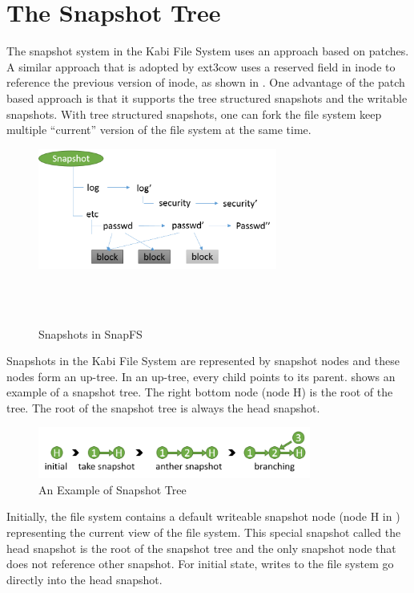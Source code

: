\section{The Snapshot Tree}

    The snapshot system in the Kabi File System uses an approach based on patches. A similar approach that is adopted by ext3cow uses a reserved field in inode to reference the previous version of inode, as shown in . One advantage of the patch based approach is that it supports the tree structured snapshots and the writable snapshots. With tree structured snapshots, one can fork the file system keep multiple ``current'' version of the file system at the same time.

\begin{figure}[t]
\centering
\includegraphics[width=0.7\textwidth]{Chapter-4/figs/fig24.png}
\caption{Snapshots in SnapFS}
~\\
~\\
\label{fig:snapfs_approach}
\end{figure}

    Snapshots in the Kabi File System are represented by snapshot nodes and these nodes form an up-tree. In an up-tree, every child points to its parent.  shows an example of a snapshot tree. The right bottom node (node H) is the root of the tree. The root of the snapshot tree is always the head snapshot.

\begin{figure}[t]
\centering
\includegraphics[width=0.8\textwidth]{Chapter-4/figs/fig13.png}
\caption{An Example of Snapshot Tree}
\label{fig:snap_tree_example}
\end{figure}

    Initially, the file system contains a default writeable snapshot node (node H in ) representing the current view of the file system. This special snapshot called the head snapshot is the root of the snapshot tree and the only snapshot node that does not reference other snapshot. For initial state,  writes to the file system go directly into the head snapshot.
    
